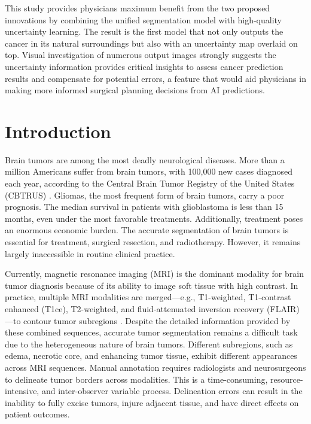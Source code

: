 \documentclass[11pt,letterpaper]{article}
\begin{document}
This study provides physicians maximum benefit from the two proposed innovations by combining the unified segmentation model with high-quality uncertainty learning. The result is the first model that not only outputs the cancer in its natural surroundings but also with an uncertainty map overlaid on top. Visual investigation of numerous output images strongly suggests the uncertainty information provides critical insights to assess cancer prediction results and compensate for potential errors, a feature that would aid physicians in making more informed surgical planning decisions from AI predictions.
\newpage
\setcounter{page}{1}
\section{Introduction}
Brain tumors are among the most deadly neurological diseases. More than a million Americans suffer from brain tumors, with 100,000 new cases diagnosed each year, according to the Central Brain Tumor Registry of the United States (CBTRUS) \cite{BraTS2023}. Gliomas, the most frequent form of brain tumors, carry a poor prognosis. The median survival in patients with glioblastoma is less than 15 months, even under the most favorable treatments. Additionally, treatment poses an enormous economic burden. The accurate segmentation of brain tumors is essential for treatment, surgical resection, and radiotherapy. However, it remains largely inaccessible in routine clinical practice.

Currently, magnetic resonance imaging (MRI) is the dominant modality for brain tumor diagnosis because of its ability to image soft tissue with high contrast. In practice, multiple MRI modalities are merged—e.g., T1-weighted, T1-contrast enhanced (T1ce), T2-weighted, and fluid-attenuated inversion recovery (FLAIR)—to contour tumor subregions \cite{desikan2006}. Despite the detailed information provided by these combined sequences, accurate tumor segmentation remains a difficult task due to the heterogeneous nature of brain tumors. Different subregions, such as edema, necrotic core, and enhancing tumor tissue, exhibit different appearances across MRI sequences. Manual annotation requires radiologists and neurosurgeons to delineate tumor borders across modalities. This is a time-consuming, resource-intensive, and inter-observer variable process. Delineation errors can result in the inability to fully excise tumors, injure adjacent tissue, and have direct effects on patient outcomes.
\end{document}
